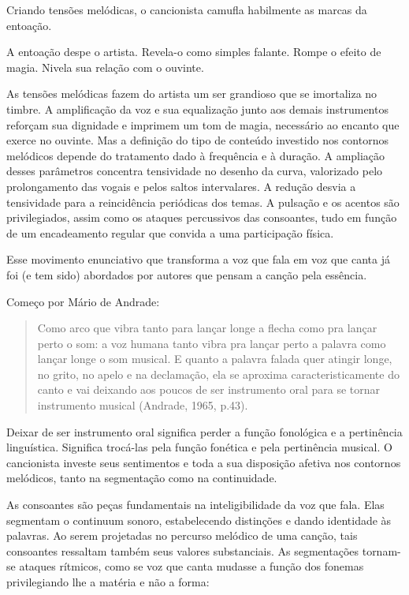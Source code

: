 Criando tensões melódicas, o cancionista camufla habilmente as marcas da
entoação.~

A entoação despe o artista. Revela-o como simples falante. Rompe o
efeito de magia. Nivela sua relação com o ouvinte.

As tensões melódicas fazem do artista um ser grandioso que se imortaliza
no timbre. A amplificação da voz e sua equalização junto aos demais
instrumentos reforçam sua dignidade e imprimem um tom de magia,
necessário ao encanto que exerce no ouvinte. Mas a definição do tipo de
conteúdo investido nos contornos melódicos depende do tratamento dado à
frequência e à duração. A ampliação desses parâmetros concentra
tensividade no desenho da curva, valorizado pelo prolongamento das
vogais e pelos saltos intervalares. A redução desvia a tensividade para
a reincidência periódicas dos temas. A pulsação e os acentos são
privilegiados, assim como os ataques percussivos das consoantes, tudo em
função de um encadeamento regular que convida a uma participação física.

Esse movimento enunciativo que transforma a voz que fala em voz que
canta já foi (e tem sido) abordados por autores que pensam a canção pela
essência.

Começo por Mário de Andrade:

\begin{quote}
Como arco que vibra tanto para lançar longe a flecha como pra lançar
perto o som: a voz humana tanto vibra pra lançar perto a palavra como
lançar longe o som musical. E quanto a palavra falada quer atingir
longe, no grito, no apelo e na declamação, ela se aproxima
caracteristicamente do canto e vai deixando aos poucos de ser
instrumento oral para se tornar instrumento musical (Andrade, 1965,
p.43).
\end{quote}

Deixar de ser instrumento oral significa perder a função fonológica e a
pertinência linguística. Significa trocá-las pela função fonética e pela
pertinência musical. O cancionista investe seus sentimentos e toda a sua
disposição afetiva nos contornos melódicos, tanto na segmentação como na
continuidade.

As consoantes são peças fundamentais na inteligibilidade da voz que
fala. Elas segmentam o continuum sonoro, estabelecendo distinções e
dando identidade às palavras. Ao serem projetadas no percurso melódico
de uma canção, tais consoantes ressaltam também seus valores
substanciais. As segmentações tornam-se ataques rítmicos, como se voz
que canta mudasse a função dos fonemas privilegiando lhe a matéria e não
a forma:

